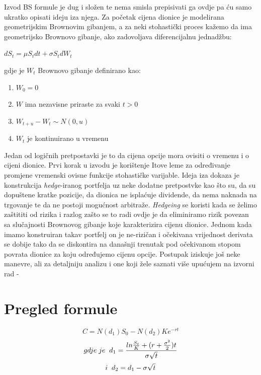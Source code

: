 \documentclass[times, utf8, seminar]{fer}
\begin{document}
Izvod BS formule je dug i složen te nema smisla prepisivati ga ovdje pa ću samo ukratko opisati ideju iza njega. Za početak cijena dionice je modelirana geometrijskim Brownovim gibanjem, a za neki stohastički proces kažemo da ima geometrijsko Brownovo gibanje, ako zadovoljava diferencijalnu jednadžbu:\\

\begin{centering}
    $dS_t = \mu S_t dt + \sigma S_t dW_t$ \\
\end{centering}

\vspace{1.5cm}

\noindent gdje je $W_t$ Brownovo gibanje definirano kao:
\begin{enumerate}
    \item $W_0 = 0$
    \item $W$ ima nezavisne priraste za svaki $t > 0$
    \item $W_{t+u} - W_t \sim N(0, u)$
    \item $W_t$ je kontinuirano u vremenu
\end{enumerate}

Jedan od logičnih pretpostavki je to da cijena opcije mora ovisiti o vremenu i o cijeni dionice. Prvi korak u izvodu je korištenje Itove leme za određivanje promjene vremenski ovisne funkcije stohastičke varijable. Ideja iza dokaza je konstrukcija \textit{hedge}-iranog portfelja uz neke dodatne pretpostvke kao što su, da su dopuštene kratke pozicije, da dionica ne isplaćuje dividende, da nema naknada na trgovanje te da ne postoji mogućnost arbitraže. \textit{Hedgeing} se koristi kada se želimo zaštititi od rizika i razlog zašto se to radi ovdje je da eliminiramo rizik povezan sa slučajnosti Brownovog gibanje koje karakterizira cijenu dionice. Jednom kada imamo konstruiran takav portfelj on je ne-rizičan  i očekivana vrijednost derivata se dobije tako da se diskontira na današnji trenutak pod očekivanom stopom povrata dionice za koju određujemo cijenu opcije. Postupak iziskuje još neke manevre, ali za detaljniju analizu i one koji žele saznati više upućujem na izvorni rad - \cite{}

\section{Pregled formule}

\[ C = N(d_1)S_0 - N(d_2)Ke^{-rt} \]
\[ gdje \hspace{0.1cm} je \hspace{0.2cm} d_1 = \frac{ln\frac{S_t}{K} + (r+\frac{\sigma^2}{2})t}{\sigma\sqrt{t}} \]
\[i \hspace{0.2cm} d_2 = d_1 - \sigma \sqrt{t}\]
\end{document}

